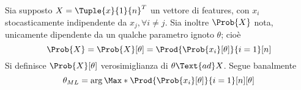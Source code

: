 \documentclass{subfiles}
\begin{document}
Sia supposto \(X = \Tuple{x}{1}{n}^{T}\) un vettore di features, con \(x_{i}\) stocasticamente indipendente da \(x_{j}, \forall i \ne j\).
Sia inoltre \(\Prob{X}\) nota, unicamente dipendente da un qualche parametro ignoto \(\theta\); cioè
\[
    \Prob{X} = \Prob{X}[\theta]  = \Prod{\Prob{x_{i}}[\theta]}{i = 1}[n]
\]
Si definisce \(\Prob{X}[\theta]\) verosimiglianza di \(\theta \Text{ad} X\).
Segue banalmente
\[
    \theta_{ML} = \arg \Max*{\Prod{\Prob{x_{i}}[\theta]}{i = 1}[n]}[\theta]
\]
\end{document}
